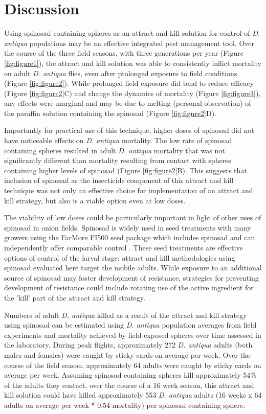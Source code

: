 \documentclass[alpha-refs]{wiley-article}
\begin{document}
\section{Discussion}

Using spinosad containing spheres as an attract and kill solution for control of \textit{D. antiqua} populations may be an effective integrated pest management tool.  Over the course of the three field seasons, with three generations per year (Figure \ref{fig:figure1}), the attract and kill solution was able to consistently inflict mortality on adult \textit{D. antiqua} flies, even after prolonged exposure to field conditions (Figure \ref{fig:figure2}).  While prolonged field exposure did tend to reduce efficacy (Figure \ref{fig:figure2}C) and change the dynamics of mortality (Figure \ref{fig:figure3}), any effects were marginal and may be due to melting (personal observation) of the paraffin solution containing the spinosad (Figure \ref{fig:figure2}D).  

Importantly for practical use of this technique, higher doses of spinosad did not have noticeable effects on \textit{D. antiqua} mortality.  The low rate of spinosad containing spheres resulted in adult \textit{D. antiqua} mortality that was not significantly different than mortality resulting from contact with spheres containing higher levels of spinosad (Figure \ref{fig:figure2}B).  This suggests that inclusion of spinosad as the insecticide component of this attract and kill technique was not only an effective choice for implementation of an attract and kill strategy, but also is a viable option even at low doses.  

The viability of low doses could be particularly important in light of other uses of spinosad in onion fields.  Spinosad is widely used in seed treatments with many growers using the FarMore FI500 seed package which includes spinosad and can independently offer comparable control \citep{nault2006performance,nault2006onion, wilson2015evaluation}.  These seed treatments are effective options of control of the larval stage; attract and kill methodologies using spinosad evaluated here target the mobile adults.  While exposure to an additional source of spinosad may foster development of resistance, strategies for preventing development of resistance could include rotating use of the active ingredient for the 'kill' part of the attract and kill strategy.   

Numbers of adult \textit{D. antiqua}  killed as a result of the attract and kill strategy using spinosad can be estimated using \textit{D. antiqua} population averages from field experiments and mortality achieved by field-exposed spheres over time assessed in the laboratory.  During peak flights, approximately 272 \textit{D. antiqua} adults (both males and females) were caught by sticky cards on average per week.  Over the course of the field season, approximately 64 adults were caught by sticky cards on average per week.  Assuming spinosad containing spheres kill approximately 54\% of the adults they contact, over the course of a 16 week season, this attract and kill solution could have killed approximately 553 \textit{D. antiqua} adults (16 weeks x 64 adults on average per week * 0.54 mortality) per spinosad containing sphere.  
\end{document}

